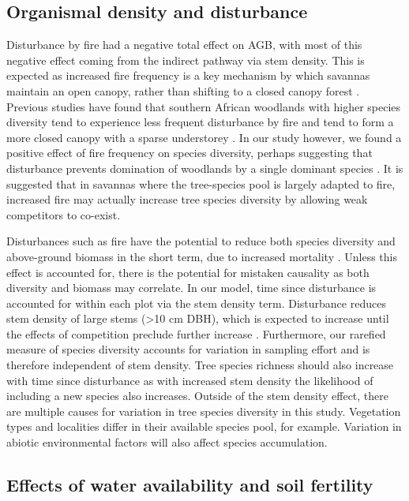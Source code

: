\documentclass[12pt,a4paper]{article}
\begin{document}
\subsection{Organismal density and disturbance}

Disturbance by fire had a negative total effect on AGB, with most of this negative effect coming from the indirect pathway via stem density. This is expected as increased fire frequency is a key mechanism by which savannas maintain an open canopy, rather than shifting to a closed canopy forest \citep{Staver2011}. Previous studies have found that southern African woodlands with higher species diversity tend to experience less frequent disturbance by fire and tend to form a more closed canopy with a sparse understorey \citep{Chidumayo2013, Mutowo2012}. In our study however, we found a positive effect of fire frequency on species diversity, perhaps suggesting that disturbance prevents domination of woodlands by a single dominant species \citep{Chidumayo2013, Durigan2020, Staver2009}. It is suggested that in savannas where the tree-species pool is largely adapted to fire, increased fire may actually increase tree species diversity by allowing weak competitors to co-exist. 

Disturbances such as fire have the potential to reduce both species diversity and above-ground biomass in the short term, due to increased mortality \citep{Huston2014}. Unless this effect is accounted for, there is the potential for mistaken causality as both diversity and biomass may correlate. In our model, time since disturbance is accounted for within each plot via the stem density term. Disturbance reduces stem density of large stems (>10 cm DBH), which is expected to increase until the effects of competition preclude further increase \citep{Johnson2012}. Furthermore, our rarefied measure of species diversity accounts for variation in sampling effort and is therefore independent of stem density. Tree species richness should also increase with time since disturbance as with increased stem density the likelihood of including a new species also increases. Outside of the stem density effect, there are multiple causes for variation in tree species diversity in this study. Vegetation types and localities differ in their available species pool, for example. Variation in abiotic environmental factors will also affect species accumulation. 

\subsection{Effects of water availability and soil fertility}
\end{document}
